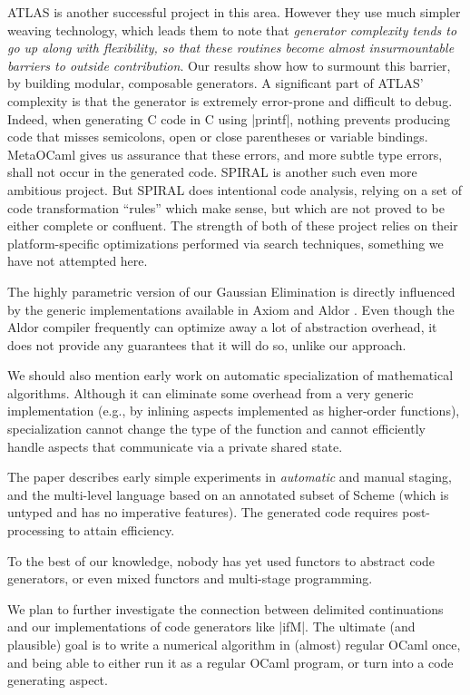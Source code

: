 \documentclass[draft]{elsart}
\begin{document}
ATLAS \cite{ATLAS} is another successful project in this area.
However they use much simpler weaving technology, which leads them to
note that \emph{generator complexity tends to go up along with
  flexibility, so that these routines become almost insurmountable
  barriers to outside contribution}. Our results show how to surmount
this barrier, by building modular, composable generators. A
significant part of ATLAS' complexity is that the generator is
extremely error-prone and difficult to debug.  Indeed, when generating
C code in C using |printf|, nothing prevents producing code that
misses semicolons, open or close parentheses or variable
bindings. MetaOCaml gives us assurance that these errors, and more
subtle type errors, shall not occur in the generated code.  SPIRAL
\cite{Pueschel:05} is another such even more ambitious project.  But
SPIRAL does intentional code analysis, relying on a set of code
transformation ``rules'' which make sense, but which are not proved to
be either complete or confluent.  The strength of both of these
project relies on their platform-specific optimizations performed via
search techniques, something we have not attempted here.

The highly parametric version of our Gaussian Elimination is directly
influenced by the generic implementations available in Axiom
\cite{Axiom} and Aldor \cite{Watt:2002:HCA}.  Even though the Aldor
compiler frequently can optimize away a lot of abstraction overhead, 
it does not provide any guarantees that it will do so, unlike our
approach.

We should also mention early work \cite{Gluck95} on automatic
specialization of mathematical algorithms. Although it can eliminate
some overhead from a very generic implementation (e.g., by inlining
aspects implemented as higher-order functions), specialization cannot
change the type of the function and cannot efficiently handle aspects
that communicate via a private shared state.

The paper \cite{GluckJ97} describes early simple experiments in
\emph{automatic} and manual staging, and the multi-level language
based on an annotated subset of Scheme (which is untyped and has no
imperative features). The generated code requires post-processing to
attain efficiency.  

To the best of our knowledge, nobody has yet used functors to
abstract code generators, or even mixed functors and 
multi-stage programming.

We plan to further investigate the connection between delimited
continuations and our implementations of code generators like
|ifM|. The ultimate (and plausible) goal is to write a numerical
algorithm in (almost) regular OCaml once, and being able to either
run it as a regular OCaml program, or turn into a code generating
aspect.
\end{document}
